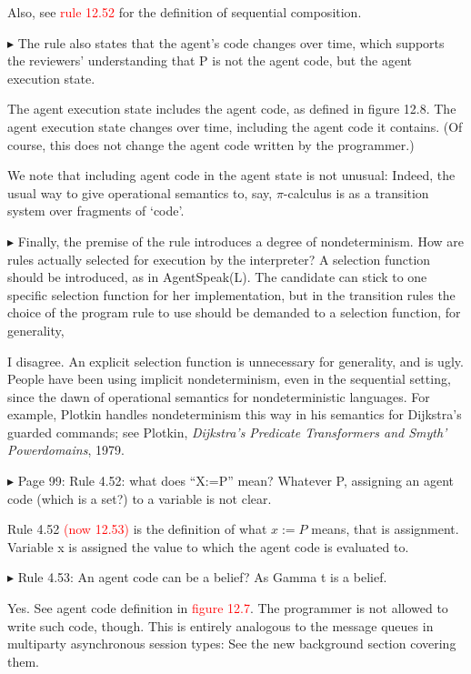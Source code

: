 \documentclass{article}
\newcommand*\R[1]{\textcolor{red}{#1}} %
\newenvironment{them}%
  {\bigskip\noindent\begingroup\color{blue}$\blacktriangleright$\enspace}%
  {\endgroup\par}
\begin{document}
Also, see \R{rule 12.52} for the definition of sequential composition.


\begin{them}
The rule also states that the agent's code changes over time, which supports
the reviewers' understanding that P is not the agent code, but the agent
execution state.
\end{them}
The agent execution state includes the agent code, as defined in figure 12.8. The agent execution state changes over time,
  including the agent code it contains.
(Of course, this does not change the agent code written by the programmer.)

We note that including agent code in the agent state is not unusual:
  Indeed, the usual way to give operational semantics to, say,
    $\pi$-calculus is as a transition system over fragments of `code'.

\begin{them}
Finally, the premise of the rule introduces a degree of nondeterminism. How are
rules actually selected for execution by the interpreter? A selection function
should be introduced, as in AgentSpeak(L). The candidate can stick to one
specific selection function for her implementation, but in the transition rules
the choice of the program rule to use should be demanded to a selection
function, for generality,
\end{them}
I disagree.
An explicit selection function is unnecessary for generality, and is ugly.
People have been using implicit nondeterminism,
  even in the sequential setting,
  since the dawn of operational semantics for nondeterministic languages.
For example,
  Plotkin handles nondeterminism this way in his semantics for
  Dijkstra's guarded commands;
see Plotkin, {\it Dijkstra's Predicate Transformers and Smyth' Powerdomains},
  1979.


\begin{them}
Page 99:
Rule 4.52: what does ``X:=P'' mean? Whatever P, assigning an agent code (which is
a set?) to a variable is not clear.
\end{them}
Rule 4.52 \R{(now 12.53)} is the definition of what $x:=P$ means, that is
assignment. Variable x is assigned the value to which the agent code is
evaluated to.

\begin{them}
Rule 4.53:
An agent code can be a belief? As Gamma t is a belief.
\end{them}
Yes. See agent code definition in \R{figure 12.7}.
The programmer is not allowed to write such code, though.
This is entirely analogous to the message queues in
  multiparty asynchronous session types:
  See the new background section covering them.
\end{document}
